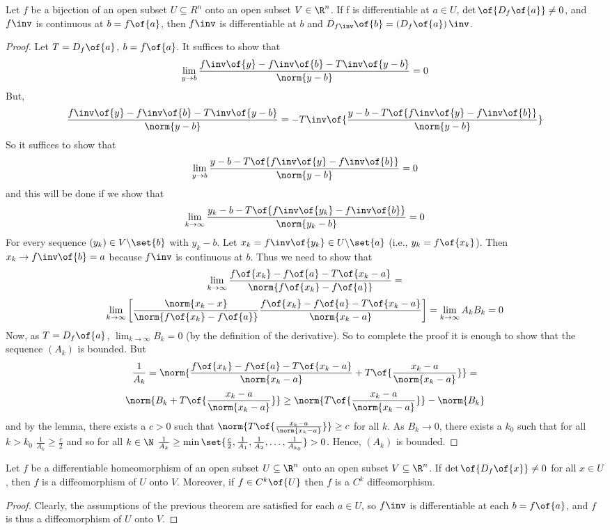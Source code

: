 \begin{theorem}
    Let $f$ be a bijection of an open subset $U \subseteq R^n$ onto an open subset $V \in \R^n$. If f is differentiable at $a \in U$, $\det\of{D_f\of{a}} \neq 0$, and $f\inv$ is continuous at $b = f\of{a}$, then $f\inv$ is differentiable at $b$ and $D_{f\inv}\of{b} = \left(D_f\of{a}\right)\inv$.
\end{theorem}
\begin{proof}
    Let $T = D_f\of{a}$, $b = f\of{a}$. It suffices to show that $$\lim_{y \to b} \frac{f\inv\of{y} - f\inv\of{b} - T\inv\of{y - b}}{\norm{y - b}} = 0$$
    But, $$\frac{f\inv\of{y} - f\inv\of{b} - T\inv\of{y-b}}{\norm{y-b}} = -T\inv\of{\frac{y - b - T\of{f\inv\of{y} - f\inv\of{b}}}{\norm{y-b}}}$$
    So it suffices to show that $$\lim_{y \to b} \frac{y - b - T\of{f\inv\of{y} - f\inv\of{b}}}{\norm{y-b}} = 0$$
    and this will be done if we show that $$\lim_{k \to \infty} \frac{y_k - b - T\of{f\inv\of{y_k} - f\inv\of{b}}}{\norm{y_k - b}} = 0$$
    For every sequence $(y_k) \in V \backslash \set{b}$ with $y_k - b$. Let $x_k = f\inv\of{y_k} \in U \backslash \set{a}$ (i.e., $y_k = f\of{x_k}$). Then $x_k \to f\inv\of{b} = a$ because $f\inv$ is continuous at $b$. Thus we need to show that $$\lim_{k \to \infty} \frac{f\of{x_k} - f\of{a} - T\of{x_k - a}}{\norm{f\of{x_k} - f\of{a}}} =$$ $$\lim_{k \to \infty} \left[ \frac{\norm{x_k - x}}{\norm{f\of{x_k} - f\of{a}}} \frac{f\of{x_k} - f\of{a} - T\of{x_k - a}}{\norm{x_k - a}} \right] = \lim_{k \to \infty} A_k B_k = 0$$
    Now, as $T = D_f\of{a}$, $\lim_{k \to \infty} B_k = 0$ (by the definition of the derivative). So to complete the proof it is enough to show that the sequence $(A_k)$ is bounded. But $$\frac{1}{A_k} = \norm{\frac{f\of{x_k} - f\of{a} - T\of{x_k - a}}{\norm{x_k - a}} + T\of{\frac{x_k - a}{\norm{x_k - a}}}} =$$ $$\norm{B_k + T\of{\frac{x_k - a}{\norm{x_k - a}}}} \geq \norm{T\of{\frac{x_k - a}{\norm{x_k - a}}}} - \norm{B_k}$$
    and by the lemma, there exists a $c > 0$ such that $\norm{T\of{\frac{x_k-a}{\norm{x_k-a}}}} \geq c$ for all $k$. As $B_k \to 0$, there exists a $k_0$ such that for all $k > k_0$ $\frac{1}{A_k} \geq \frac{c}{2}$ and so for all $k \in \N$ $\frac{1}{A_k} \geq \min \set{\frac{c}{2}, \frac{1}{A_1}, \frac{1}{A_2}, \dots, \frac{1}{A_{k_0}}} > 0$. Hence, $(A_k)$ is bounded.
\end{proof}

\begin{corollary}
    Let $f$ be a differentiable homeomorphism of an open subset $U \subseteq \R^n$ onto an open subset $V \subseteq \R^n$. If $\det\of{D_f\of{x}} \neq 0$ for all $x \in U$, then $f$ is a diffeomorphism of $U$ onto $V$. Moreover, if $f \in C^k\of{U}$ then $f$ is a $C^k$ diffeomorphism.
\end{corollary}
\begin{proof}
    Clearly, the assumptions of the previous theorem are satisfied for each $a \in U$, so $f\inv$ is differentiable at each $b = f\of{a}$, and $f$ is thus a diffeomorphism of $U$ onto $V$.
\end{proof}

